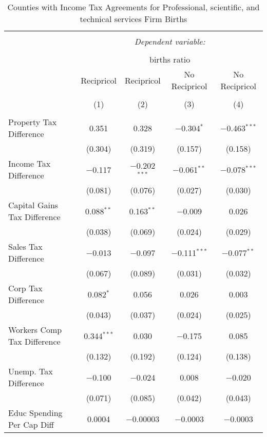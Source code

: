 
\begin{table}[!htbp] \centering 
  \caption{Counties with Income Tax Agreements for  Professional, scientific, and technical services Firm Births} 
  \label{54agreement} 
\begin{tabular}{@{\extracolsep{5pt}}lcccc} 
\\[-1.8ex]\hline 
\hline \\[-1.8ex] 
 & \multicolumn{4}{c}{\textit{Dependent variable:}} \\ 
\cline{2-5} 
\\[-1.8ex] & \multicolumn{4}{c}{births ratio} \\ 
 & Recipricol & Recipricol & No Recipricol & No Recipricol \\ 
\\[-1.8ex] & (1) & (2) & (3) & (4)\\ 
\hline \\[-1.8ex] 
 Property Tax Difference & 0.351 & 0.328 & $-$0.304$^{*}$ & $-$0.463$^{***}$ \\ 
  & (0.304) & (0.319) & (0.157) & (0.158) \\ 
  Income Tax Difference & $-$0.117 & $-$0.202$^{***}$ & $-$0.061$^{**}$ & $-$0.078$^{***}$ \\ 
  & (0.081) & (0.076) & (0.027) & (0.030) \\ 
  Capital Gains Tax Difference & 0.088$^{**}$ & 0.163$^{**}$ & $-$0.009 & 0.026 \\ 
  & (0.038) & (0.069) & (0.024) & (0.029) \\ 
  Sales Tax Difference & $-$0.013 & $-$0.097 & $-$0.111$^{***}$ & $-$0.077$^{**}$ \\ 
  & (0.067) & (0.089) & (0.031) & (0.032) \\ 
  Corp Tax Difference & 0.082$^{*}$ & 0.056 & 0.026 & 0.003 \\ 
  & (0.043) & (0.037) & (0.024) & (0.025) \\ 
  Workers Comp Tax Difference & 0.344$^{***}$ & 0.030 & $-$0.175 & 0.085 \\ 
  & (0.132) & (0.192) & (0.124) & (0.138) \\ 
  Unemp. Tax Difference & $-$0.100 & $-$0.024 & 0.008 & $-$0.020 \\ 
  & (0.071) & (0.085) & (0.042) & (0.043) \\ 
  Educ Spending Per Cap Diff & 0.0004 & $-$0.00003 & $-$0.0003 & $-$0.0003 \\ 

\end{tabular}
\end{table}
